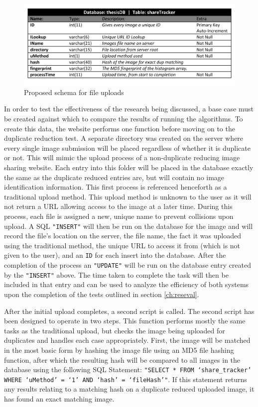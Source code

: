 \begin{figure}[htbp]
\centering
\includegraphics[width=6in]{schema}
\caption{Proposed schema for file uploads}
\label{fig:schema}
\end{figure}

In order to test the effectiveness of the research being discussed, a base case must be created against which to compare the results of running the algorithms. To create this data, the website performs one function before moving on to the duplicate reduction test. A separate directory was created on the server where every single image submission will be placed regardless of whether it is duplicate or not. This will mimic the upload process of a non-duplicate reducing image sharing website. Each entry into this folder will be placed in the database exactly the same as the duplicate reduced entries are, but will contain no image identification information. This first process is referenced henceforth as a traditional upload method. This upload method is unknown to the user as it will not return a URL allowing access to the image at a later time. During this process, each file is assigned a new, unique name to prevent collisions upon upload. A SQL {\tt "INSERT"} will then be run on the database for the image and will record the file's location on the server, the file name, the fact it was uploaded using the traditional method, the unique URL to access it from (which is not given to the user), and an {\tt ID} for each insert into the database. After the completion of the process an {\tt "UPDATE"} will be run on the database entry created by the {\tt "INSERT"} above. The time taken to complete the task will then be included in that entry and can be used to analyze the efficiency of both systems upon the completion of the tests outlined in section \ref{ch:reseval}.

After the initial upload completes, a second script is called. The second script has been designed to operate in two steps. This function performs mostly the same tasks as the traditional upload, but checks the image being uploaded for duplicates and handles each case appropriately. First, the image will be matched in the most basic form by hashing the image file using an MD5 file hashing function, after which the resulting hash will be compared to all images in the database using the following SQL Statement: {\tt "SELECT * FROM `share\_tracker' WHERE `uMethod' = `1' AND `hash' = `fileHash'"}. If this statement returns any results relating to a matching hash on a duplicate reduced uploaded image, it has found an exact matching image. 

